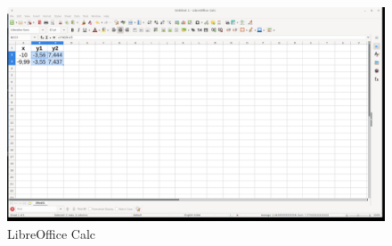 \begin{figure}[h!]		
	\centering
   	\includegraphics[width=8.0in]{pictures/picture_010.png}
  	\caption{LibreOffice Calc}
   	\label{fig:LibreOfficeCalc010}
\end{figure}